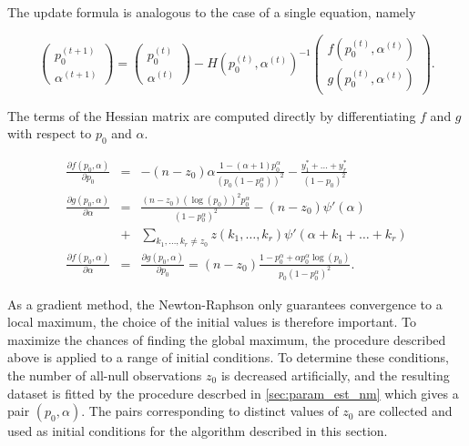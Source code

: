 \documentclass[12pt]{article}
\begin{document}
    The update formula is analogous to the case of a single equation,
    namely

    \begin{equation*}
      \left(
        \begin{array}{ll} p_0^{(t+1)} \\
        \alpha^{(t+1)} \end{array} \right) =
      \left(
      \begin{array}{ll} p_0^{(t)} \\ \alpha^{(t)} \end{array} \right) -
        H(p_0^{(t)}, \alpha^{(t)})^{-1} \left(
      \begin{array}{ll} f(p_0^{(t)},\alpha^{(t)}) \\
      g(p_0^{(t)},\alpha^{(t)})
      \end{array} \right).
    \end{equation*}

    The terms of the Hessian matrix are computed directly by
    differentiating $f$ and $g$ with respect to $p_0$ and
    $\alpha$.

    \begin{eqnarray*}
      \frac{\partial f(p_0,\alpha)}{\partial p_0} &=&
      -(n-z_0)\alpha \frac{1-(\alpha+1)p_0^{\alpha}}
      {(p_0(1-p_0^{\alpha}))^2} - \frac{y_1^*+\ldots+y_r^*}
        {(1-p_0)^2} \\
      \frac{\partial g(p_0,\alpha)}{\partial \alpha} &=&
      \frac{(n-z_0)(\log(p_0))^2p_0^{\alpha}}
      {(1-p_0^{\alpha})^2} -(n-z_0)\psi'(\alpha) \\
      &+& \sum_{k_1,\ldots,k_r \neq z_0}z(k_1, \ldots, k_r)
      \psi'(\alpha+k_1+\ldots+k_r) \\
      \frac{\partial f(p_0,\alpha)}{\partial \alpha} &=&
      \frac{\partial g(p_0,\alpha)}{\partial p_0} =
      (n-z_0)\frac{1-p_0^{\alpha}+\alpha p_0^{\alpha} \log(p_0)}
      {p_0(1-p_0^{\alpha})^2}.
    \end{eqnarray*}

    As a gradient method, the Newton-Raphson only guarantees
    convergence to a local maximum, the choice of the initial values
    is therefore important. To maximize the chances of finding the
    global maximum, the procedure described above is applied to
    a range of initial conditions. To determine these conditions,
    the number of all-null observations $z_0$ is decreased
    artificially, and the resulting dataset is fitted by the
    procedure descrbed in \ref{sec:param_est_nm} which gives a pair
    $(p_0, \alpha)$. The pairs corresponding to distinct values of
    $z_0$ are collected and used as initial conditions for the
    algorithm described in this section.
\end{document}

